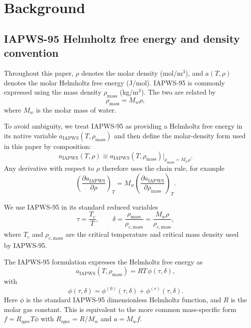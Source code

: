 \documentclass[12pt]{article}
\begin{document}
\section{Background}

\subsection{IAPWS-95 Helmholtz free energy and density convention}

Throughout this paper, $\rho$ denotes the molar density (mol/m$^3$), and $a(T,\rho)$ denotes the molar Helmholtz free energy (J/mol). IAPWS-95 is commonly expressed using the mass density $\rho_{\mathrm{mass}}$ (kg/m$^3$). The two are related by
\begin{equation}
  \rho_{\mathrm{mass}}=M_w\rho,
\end{equation}
where $M_w$ is the molar mass of water.

To avoid ambiguity, we treat IAPWS-95 as providing a Helmholtz free energy in its native variable $a_{\mathrm{IAPWS}}(T,\rho_{\mathrm{mass}})$ and then define the molar-density form used in this paper by composition:
\begin{equation}
  a_{\mathrm{IAPWS}}(T,\rho)\equiv a_{\mathrm{IAPWS}}(T,\rho_{\mathrm{mass}})\big|_{\rho_{\mathrm{mass}}=M_w\rho}.
\end{equation}
Any derivative with respect to $\rho$ therefore uses the chain rule, for example
\begin{equation}
  \left(\frac{\partial a_{\mathrm{IAPWS}}}{\partial \rho}\right)_T
  =M_w\left(\frac{\partial a_{\mathrm{IAPWS}}}{\partial \rho_{\mathrm{mass}}}\right)_T.
\end{equation}

We use IAPWS-95 in its standard reduced variables
\begin{equation}
  \tau=\frac{T_c}{T},\qquad
  \delta=\frac{\rho_{\mathrm{mass}}}{\rho_{c,\mathrm{mass}}}=\frac{M_w\rho}{\rho_{c,\mathrm{mass}}},
\end{equation}
where $T_c$ and $\rho_{c,\mathrm{mass}}$ are the critical temperature and critical mass density used by IAPWS-95.

The IAPWS-95 formulation expresses the Helmholtz free energy as \cite{WagnerPruss2002,IAPWS95}
\begin{equation}
  a_{\mathrm{IAPWS}}(T,\rho_{\mathrm{mass}})=RT\,\phi(\tau,\delta),
\end{equation}
with
\begin{equation}
  \phi(\tau,\delta)=\phi^{(0)}(\tau,\delta)+\phi^{(r)}(\tau,\delta).
\end{equation}
Here $\phi$ is the standard IAPWS-95 dimensionless Helmholtz function, and $R$ is the molar gas constant. This is equivalent to the more common mass-specific form $f=R_{\mathrm{spec}}T\phi$ with $R_{\mathrm{spec}}=R/M_w$ and $a=M_w f$.
\end{document}
